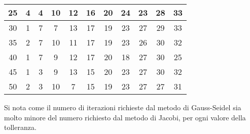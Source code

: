 \begin{sol}
\begin{center}
\begin{tabular}{|c||c|c|c|c|c|c|c|c|c|c|}
        25 & 4 & 4 & 10 & 12 & 16 & 20 & 24 & 23 & 28 & 33 \\ \hline
        30 & 1 & 7 & 7 & 13 & 17 & 19 & 23 & 27 & 29 & 33 \\ \hline
        35 & 2 & 7 & 10 & 11 & 17 & 19 & 23 & 26 & 30 & 32 \\ \hline
        40 & 1 & 7 & 9 & 12 & 17 & 20 & 18 & 27 & 30 & 25 \\ \hline
        45 & 1 & 3 & 9 & 13 & 15 & 20 & 23 & 27 & 30 & 32 \\ \hline
        50 & 2 & 3 & 10 & 7 & 15 & 19 & 23 & 27 & 27 & 31 \\ \hline
        \end{tabular}\end{center}
        \normalsize Si nota come il numero di iterazioni richieste dal metodo di Gauss-Seidel sia molto minore del numero richiesto dal metodo di Jacobi, per ogni valore della tolleranza.
      \end{sol}
